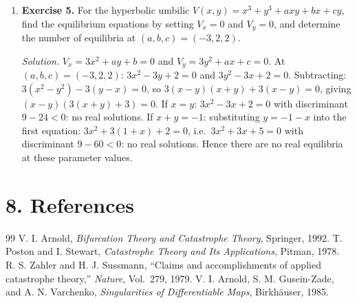 \begin{enumerate}[leftmargin=*,itemsep=0.9em]
\item \textbf{Exercise 5.} For the hyperbolic umbilic $V(x,y)=x^3+y^3+axy+bx+cy$, find the equilibrium equations by setting $V_x=0$ and $V_y=0$, and determine the number of equilibria at $(a,b,c)=(-3,2,2)$.

\emph{Solution.} $V_x=3x^2+ay+b=0$ and $V_y=3y^2+ax+c=0$. At $(a,b,c)=(-3,2,2)$: $3x^2-3y+2=0$ and $3y^2-3x+2=0$. Subtracting: $3(x^2-y^2)-3(y-x)=0$, so $3(x-y)(x+y)+3(x-y)=0$, giving $(x-y)(3(x+y)+3)=0$. If $x=y$: $3x^2-3x+2=0$ with discriminant $9-24<0$: no real solutions. If $x+y=-1$: substituting $y=-1-x$ into the first equation: $3x^2+3(1+x)+2=0$, i.e.\ $3x^2+3x+5=0$ with discriminant $9-60<0$: no real solutions. Hence there are no real equilibria at these parameter values.

\end{enumerate}
\section*{8. References}
\begin{thebibliography}{99}
 V. I. Arnold, \emph{Bifurcation Theory and Catastrophe Theory}, Springer, 1992.
 T. Poston and I. Stewart, \emph{Catastrophe Theory and Its Applications}, Pitman, 1978.
 R. S. Zahler and H. J. Sussmann, ``Claims and accomplishments of applied catastrophe theory,'' \emph{Nature}, Vol.~279, 1979.
 V. I. Arnold, S. M. Gusein-Zade, and A. N. Varchenko, \emph{Singularities of Differentiable Maps}, Birkhäuser, 1985.
\end{thebibliography}
